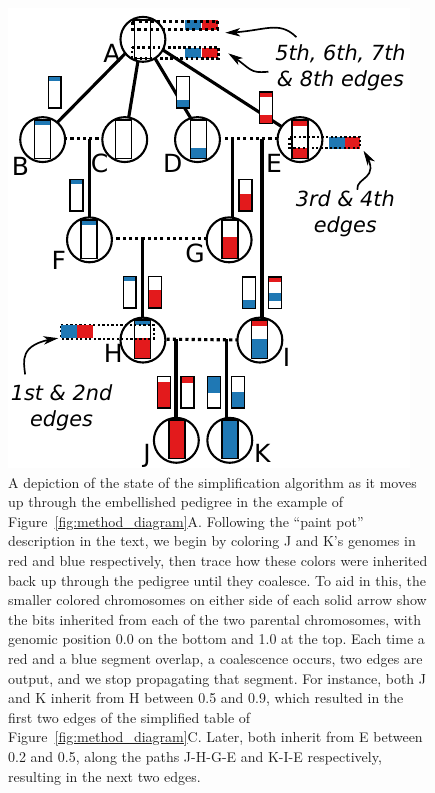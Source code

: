 \documentclass{article}
\begin{document}
\begin{figure}
    \begin{center}
        \includegraphics{simplify-state-diagram}
    \end{center}
    \caption{
        A depiction of the state of the simplification algorithm
        as it moves up through the embellished pedigree
        in the example of Figure~\ref{fig:method_diagram}A.
        Following the ``paint pot'' description in the text,
        we begin by coloring J and K's genomes in red and blue respectively,
        then trace how these colors were inherited back up through the pedigree
        until they coalesce.
        To aid in this,
        the smaller colored chromosomes on either side of each solid arrow
        show the bits inherited from each of the two parental chromosomes,
        with genomic position 0.0 on the bottom and 1.0 at the top.
        Each time a red and a blue segment overlap, a coalescence occurs, two edges are output,
        and we stop propagating that segment.
        For instance, both J and K inherit from H between 0.5 and 0.9,
        which resulted in the first two edges of the simplified table of Figure~\ref{fig:method_diagram}C.
        Later, both inherit from E between 0.2 and 0.5,
        along the paths J-H-G-E and K-I-E respectively,
        resulting in the next two edges.
        \label{fig:simplify_state}
    }
\end{figure}
\end{document}
